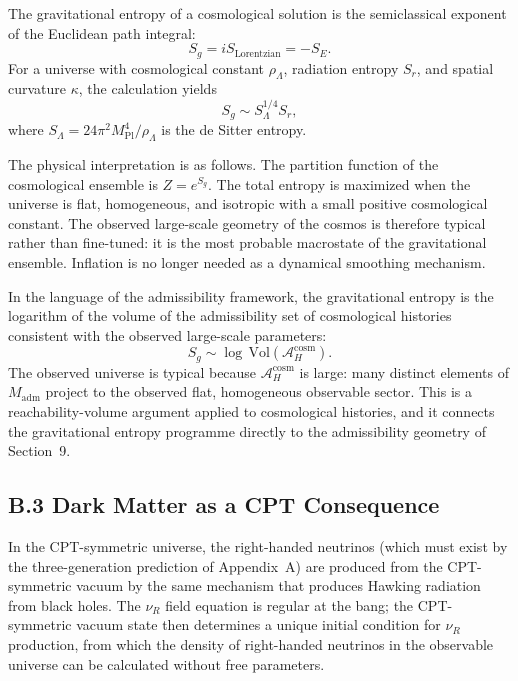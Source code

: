 \documentclass[12pt,a4paper]{article}
\theoremstyle{remark}
\begin{document}
The gravitational entropy of a cosmological solution is the semiclassical exponent of the
Euclidean path integral:
\begin{equation}
  S_g = iS_{\mathrm{Lorentzian}} = -S_E.
\end{equation}
For a universe with cosmological constant $\rho_\Lambda$, radiation entropy $S_r$, and
spatial curvature $\kappa$, the calculation yields
\begin{equation}
  S_g \sim S_\Lambda^{1/4} S_r,
\end{equation}
where $S_\Lambda = 24\pi^2 M_{\mathrm{Pl}}^4 / \rho_\Lambda$ is the de Sitter entropy.

The physical interpretation is as follows. The partition function of the cosmological ensemble
is $Z = e^{S_g}$. The total entropy is maximized when the universe is flat, homogeneous, and
isotropic with a small positive cosmological constant. The observed large-scale geometry of the
cosmos is therefore typical rather than fine-tuned: it is the most probable macrostate of the
gravitational ensemble. Inflation is no longer needed as a dynamical smoothing mechanism.

In the language of the admissibility framework, the gravitational entropy is the logarithm of
the volume of the admissibility set of cosmological histories consistent with the observed
large-scale parameters:
\begin{equation}
  S_g \sim \log\,\mathrm{Vol}(\mathcal{A}_H^{\mathrm{cosm}}).
\end{equation}
The observed universe is typical because $\mathcal{A}_H^{\mathrm{cosm}}$ is large: many
distinct elements of $M_{\mathrm{adm}}$ project to the observed flat, homogeneous observable
sector. This is a reachability-volume argument applied to cosmological histories, and it
connects the gravitational entropy programme directly to the admissibility geometry of
Section~9.

\subsection*{B.3 Dark Matter as a CPT Consequence}

In the CPT-symmetric universe, the right-handed neutrinos (which must exist by the
three-generation prediction of Appendix~A) are produced from the CPT-symmetric vacuum
by the same mechanism that produces Hawking radiation from black holes. The $\nu_R$ field
equation is regular at the bang; the CPT-symmetric vacuum state then determines a unique
initial condition for $\nu_R$ production, from which the density of right-handed neutrinos
in the observable universe can be calculated without free parameters.
\end{document}
